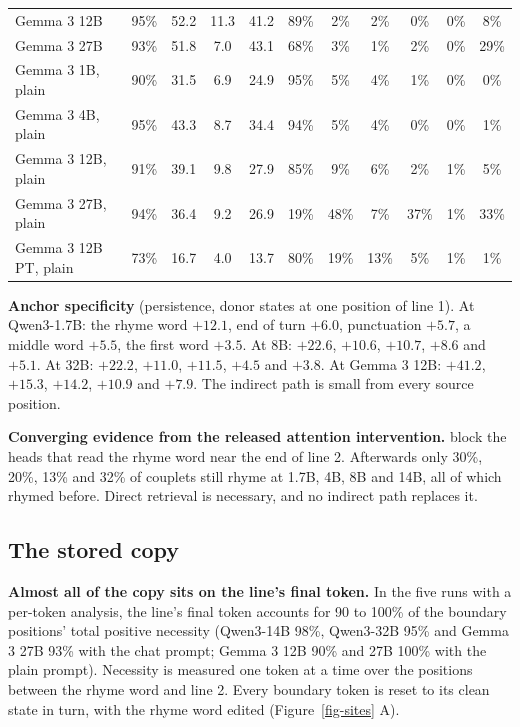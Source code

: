\documentclass[
]{article}
\begin{document}
\begin{table}
{\begin{tabular}{@{}lcccccccccc@{}}
Gemma 3 12B & 95\% & 52.2 & 11.3 & 41.2 & 89\% & 2\% & 2\% & 0\% & 0\% & 8\%\\
Gemma 3 27B & 93\% & 51.8 & 7.0 & 43.1 & 68\% & 3\% & 1\% & 2\% & 0\% & 29\%\\
Gemma 3 1B, plain & 90\% & 31.5 & 6.9 & 24.9 & 95\% & 5\% & 4\% & 1\% & 0\% & 0\%\\
Gemma 3 4B, plain & 95\% & 43.3 & 8.7 & 34.4 & 94\% & 5\% & 4\% & 0\% & 0\% & 1\%\\
Gemma 3 12B, plain & 91\% & 39.1 & 9.8 & 27.9 & 85\% & 9\% & 6\% & 2\% & 1\% & 5\%\\
Gemma 3 27B, plain & 94\% & 36.4 & 9.2 & 26.9 & 19\% & 48\% & 7\% & 37\% & 1\% & 33\%\\
Gemma 3 12B PT, plain & 73\% & 16.7 & 4.0 & 13.7 & 80\% & 19\% & 13\% & 5\% & 1\% & 1\%\\
\bottomrule
\end{tabular}

}

\end{table}%

\textbf{Anchor specificity} (persistence, donor states at one position
of line 1). At Qwen3-1.7B: the rhyme word \(+12.1\), end of turn
\(+6.0\), punctuation \(+5.7\), a middle word \(+5.5\), the first word
\(+3.5\). At 8B: \(+22.6\), \(+10.6\), \(+10.7\), \(+8.6\) and \(+5.1\).
At 32B: \(+22.2\), \(+11.0\), \(+11.5\), \(+4.5\) and \(+3.8\). At Gemma
3 12B: \(+41.2\), \(+15.3\), \(+14.2\), \(+10.9\) and \(+7.9\). The
indirect path is small from every source position.

\textbf{Converging evidence from the released attention intervention.}
\citet{hanna2026latent} block the heads that read the rhyme word near
the end of line 2. Afterwards only 30\%, 20\%, 13\% and 32\% of couplets
still rhyme at 1.7B, 4B, 8B and 14B, all of which rhymed before. Direct
retrieval is necessary, and no indirect path replaces it.

\subsection{The stored copy}\label{sec-app-storedcopy}

\textbf{Almost all of the copy sits on the line's final token.} In the
five runs with a per-token analysis, the line's final token accounts for
90 to 100\% of the boundary positions' total positive necessity
(Qwen3-14B 98\%, Qwen3-32B 95\% and Gemma 3 27B 93\% with the chat
prompt; Gemma 3 12B 90\% and 27B 100\% with the plain prompt). Necessity
is measured one token at a time over the positions between the rhyme
word and line 2. Every boundary token is reset to its clean state in
turn, with the rhyme word edited (Figure~\ref{fig-sites} A).
\end{document}
